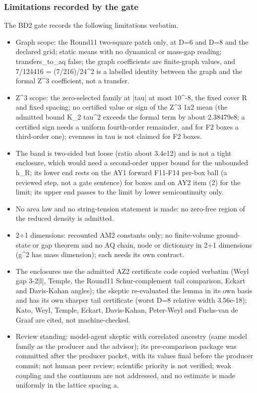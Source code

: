 \subsubsection{Limitations recorded by the gate}
\label{sec:bd2-limits}
The BD2 gate records the following limitations verbatim.
\begin{gatequote}
\begin{itemize}
\item Graph scope: the Round11 two-square patch only, at D=6 and D=8 and the
declared grid; static means with no dynamical or mass-gap reading;
transfers\_to\_aq false; the graph coefficients are finite-graph values, and
7/124416 = (7/216)/24\textasciicircum{}2 is a labelled identity between the
graph and the formal Z\textasciicircum{}3 coefficient, not a transfer.
\item Z\textasciicircum{}3 scope: the zero-selected family at |tau| at most
10\textasciicircum{}-8, the fixed cover R and fixed spacing; no certified
value or sign of the Z\textasciicircum{}3 1x2 mean (the admitted bound
K\_2\textquotesingle{} tau\textasciicircum{}2 exceeds the formal term by about
2.38479e8; a certified sign needs a uniform fourth-order remainder, and for F2
boxes a third-order one); evenness in tau is not claimed for F2 boxes.
\item The band is two-sided but loose (ratio about 3.4e12) and is not a tight
enclosure, which would need a second-order upper bound for the unbounded h\_R;
its lower end rests on the AY1 forward F11-F14 per-box ball (a reviewed step,
not a gate sentence) for boxes and on AY2 item (2) for the limit; its upper
end passes to the limit by lower semicontinuity only.
\item No area law and no string-tension statement is made: no zero-free region
of the reduced density is admitted.
\item 2+1 dimensions: recounted AM2 constants only; no finite-volume
ground-state or gap theorem and no AQ chain, node or dictionary in 2+1
dimensions (g\textasciicircum{}2 has mass dimension); each needs its own
contract.
\item The enclosures use the admitted AZ2 certificate code copied verbatim
(Weyl gap 3-2|l|, Temple, the Round11 Schur-complement tail comparison, Eckart
and Davis-Kahan angles); the skeptic re-evaluated the lemma in its own basis
and has its own sharper tail certificate (worst D=8 relative width 3.56e-18);
Kato, Weyl, Temple, Eckart, Davis-Kahan, Peter-Weyl and Fuchs-van de Graaf are
cited, not machine-checked.
\item Review standing: model-agent skeptic with correlated ancestry (same
model family as the producer and the advisor); its pre-comparison package was
committed after the producer packet, with its values final before the producer
commit; not human peer review; scientific priority is not verified; weak
coupling and the continuum are not addressed, and no estimate is made
uniformly in the lattice spacing a.
\end{itemize}
\end{gatequote}
